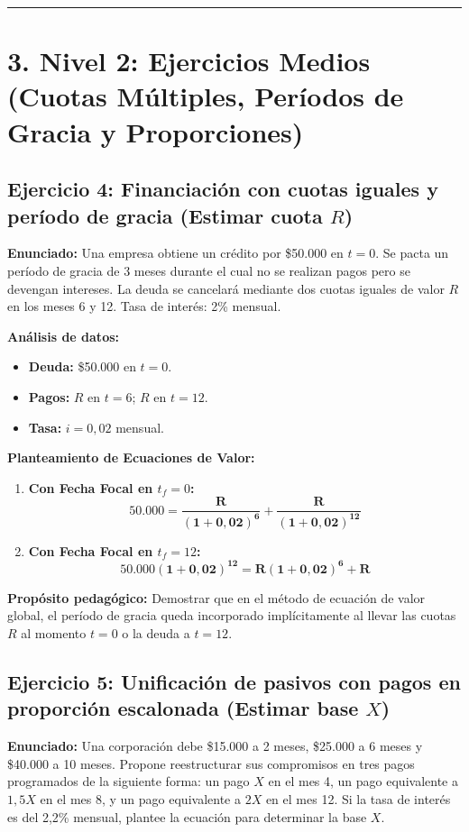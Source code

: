\documentclass[11pt, a4paper]{article}
\begin{document}
\vspace{0.3cm}
\hrule
\vspace{0.3cm}

\section*{\color{primary} 3. Nivel 2: Ejercicios Medios (Cuotas Múltiples, Períodos de Gracia y Proporciones)}

\subsection*{\color{secondary} Ejercicio 4: Financiación con cuotas iguales y período de gracia (Estimar cuota $R$)}
\textbf{Enunciado:} Una empresa obtiene un crédito por \$50.000 en $t=0$. Se pacta un período de gracia de 3 meses durante el cual no se realizan pagos pero se devengan intereses. La deuda se cancelará mediante dos cuotas iguales de valor $R$ en los meses 6 y 12. Tasa de interés: 2\% mensual.

\textbf{Análisis de datos:}
\begin{itemize}
    \item \textbf{Deuda:} \$50.000 en $t=0$.
    \item \textbf{Pagos:} $R$ en $t=6$; $R$ en $t=12$.
    \item \textbf{Tasa:} $i = 0,02$ mensual.
\end{itemize}

\textbf{Planteamiento de Ecuaciones de Valor:}
\begin{enumerate}[label=\alph*)]
    \item \textbf{Con Fecha Focal en $t_f = 0$:}
    \[
    \mathbf{50.000 = \frac{R}{(1 + 0,02)^6} + \frac{R}{(1 + 0,02)^{12}}}
    \]

    \item \textbf{Con Fecha Focal en $t_f = 12$:}
    \[
    \mathbf{50.000(1 + 0,02)^{12} = R(1 + 0,02)^6 + R}
    \]
\end{enumerate}

\textbf{Propósito pedagógico:} Demostrar que en el método de ecuación de valor global, el período de gracia queda incorporado implícitamente al llevar las cuotas $R$ al momento $t=0$ o la deuda a $t=12$.

\vspace{0.2cm}

\subsection*{\color{secondary} Ejercicio 5: Unificación de pasivos con pagos en proporción escalonada (Estimar base $X$)}
\textbf{Enunciado:} Una corporación debe \$15.000 a 2 meses, \$25.000 a 6 meses y \$40.000 a 10 meses. Propone reestructurar sus compromisos en tres pagos programados de la siguiente forma: un pago $X$ en el mes 4, un pago equivalente a $1,5X$ en el mes 8, y un pago equivalente a $2X$ en el mes 12. Si la tasa de interés es del 2,2\% mensual, plantee la ecuación para determinar la base $X$.
\end{document}
